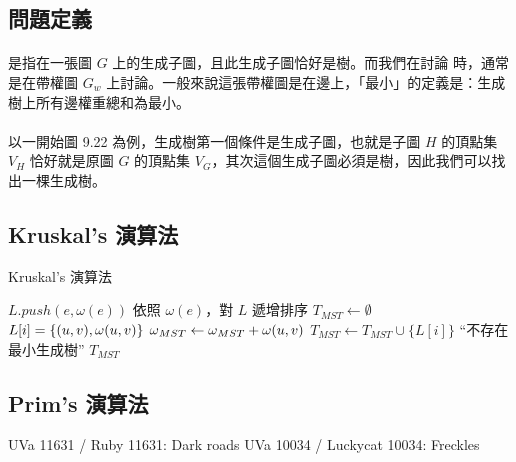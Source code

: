 \documentclass[12pt,a4paper,oneside]{report}
\begin{document}
\begin{CJK}{UTF8}{bkai}
\subsection{問題定義}
\paragraph{} 是指在一張圖 $G$ 上的生成子圖，且此生成子圖恰好是樹。而我們在討論\textbf{} 時，通常是在帶權圖 $G_w$ 上討論。一般來說這張帶權圖是在邊上，「最小」的定義是：生成樹上所有邊權重總和為最小。
\paragraph{}以一開始圖 9.22 為例，生成樹第一個條件是生成子圖，也就是子圖 $H$ 的頂點集 $V_H$ 恰好就是原圖 $G$ 的頂點集 $V_G$，其次這個生成子圖必須是樹，因此我們可以找出一棵生成樹。

\subsection{Kruskal's 演算法}
\begin{algorithm}
\label{algo-kruskal}
\caption{Kruskal's 演算法}
\begin{algorithmic}[1]
    \State $L.push(e,\omega{(e)})$
  \EndFor
    \State {}
  \EndFor
  \State 依照 $\omega{(e)}$，對 $L$ 遞增排序
  \State $T_{MST}\gets{\emptyset}$
    \State $L[i]=\{{({u},{v}),\omega{\ensuremath{({u},{v})}}}\}$
      \State {}
      \State $\omega{}_{MST}\gets{\omega{}_{MST}+\omega{\ensuremath{({u},{v})}}}$
      \State $T_{MST}\gets{T_{MST}\cup{\{L[i]\}}}$
    \EndIf
  \EndFor
    \State \Return ``不存在最小生成樹''
  \EndIf
  \State \Return $T_{MST}$
\EndProcedure
\end{algorithmic}
\end{algorithm}

\subsection{Prim's 演算法}

UVa 11631 / Ruby 11631: Dark roads
UVa 10034 / Luckycat 10034: Freckles


\end{CJK}
\end{document}
